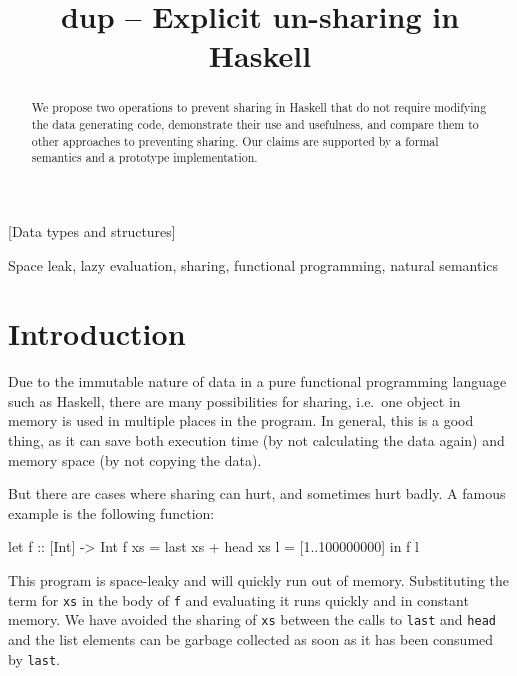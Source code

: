 \documentclass[preprint]{sigplanconf}
\title{dup -- Explicit un-sharing in Haskell}
\theoremstyle{nonumberplain}
\newcommand{\li}{\lstinline[style=Haskell]}
\begin{document}
\maketitle

\begin{abstract}
We propose two operations to prevent sharing in Haskell that do not require modifying the data generating code, demonstrate their use and usefulness, and compare them to other approaches to preventing sharing. Our claims are supported by a formal semantics and a prototype implementation.
\end{abstract}


[Data types and structures]

\keywords Space leak, lazy evaluation, sharing, functional programming, natural semantics


\section{Introduction}

Due to the immutable nature of data in a pure functional programming language such as Haskell, there are many possibilities for sharing, i.e.\ one object in memory is used in multiple places in the program. In general, this is a good thing, as it can save both execution time (by not calculating the data again) and memory space (by not copying the data).

But there are cases where sharing can hurt, and sometimes hurt badly. A famous example is the following function:
\begin{haskell}
let f :: [Int] -> Int
    f xs = last xs + head xs
    l = [1..100000000]
in  f l
\end{haskell}
This program is space-leaky and will quickly run out of memory. Substituting the term for \li-xs- in the body of \li-f- and evaluating it runs quickly and in constant memory. We have avoided the sharing of \li-xs- between the calls to \li-last- and \li-head- and the list elements can be garbage collected as soon as it has been consumed by \li-last-.
\end{document}
